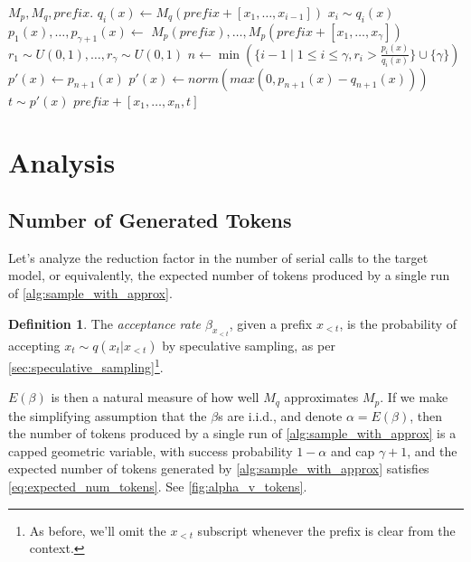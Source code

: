 \documentclass[nohyperref]{article}
\theoremstyle{plain}
\theoremstyle{definition}
\newtheorem{definition}[theorem]{Definition}
\theoremstyle{remark}
\begin{document}
\begin{algorithm}
  \caption{SpeculativeDecodingStep}
  \label{alg:sample_with_approx}
\begin{algorithmic}
   $M_p, M_q, prefix$.
  \STATE {}
    \STATE $q_i(x) \gets M_q(prefix + [x_1, \ldots, x_{i-1}])$
    \STATE $x_i \sim q_i(x)$
  \ENDFOR
  \STATE {}
  \STATE $p_1(x), \ldots, p_{\gamma + 1}(x) \gets$
  \STATE \quad \quad $M_p(prefix), \ldots, M_p(prefix + [x_1, \ldots, x_{\gamma}])$
  \STATE {}
  \STATE $r_1 \sim U(0, 1), \dots, r_\gamma \sim U(0, 1)$
  \STATE $n \gets \min(\{ i - 1 \mid 1 \le i \le \gamma, r_i > \frac{p_i(x)}{q_i(x)} \} \cup \{ \gamma \})$
  \STATE {}
  \STATE $p'(x) \gets p_{n+1}(x)$
    \STATE $p'(x) \gets norm(max(0, p_{n+1}(x) - q_{n+1}(x)))$
  \ENDIF
  \STATE {}
  \STATE $t \sim p'(x)$
   $prefix + [x_1, \ldots, x_{n}, t]$
\end{algorithmic}
\end{algorithm}

\section{Analysis}

\subsection{Number of Generated Tokens}
\label{sec:num_generated_tokens}
Let's analyze the reduction factor in the number of serial calls to the target model, or equivalently, the expected number of tokens produced by a single run of \cref{alg:sample_with_approx}.

\begin{definition}
\label{def:beta_prefix}
The \emph{acceptance rate $\beta_{x_{<t}}$}, given a prefix $x_{<t}$, is the probability of accepting $x_t \sim q(x_t|x_{<t})$ by speculative sampling, as per \cref{sec:speculative_sampling}\footnote{As before, we'll omit the $x_{<t}$ subscript whenever the prefix is clear from the context.}.
\end{definition}

$E(\beta)$ is then a natural measure of how well $M_q$ approximates $M_p$. If we make the simplifying assumption that the $\beta$s are i.i.d., and denote $\alpha = E(\beta)$, then the number of tokens produced by a single run of \cref{alg:sample_with_approx} is a capped geometric variable, with success probability $1 - \alpha$ and cap $\gamma + 1$, and the expected number of tokens generated by \cref{alg:sample_with_approx} satisfies \cref{eq:expected_num_tokens}. See \cref{fig:alpha_v_tokens}.
\end{document}
